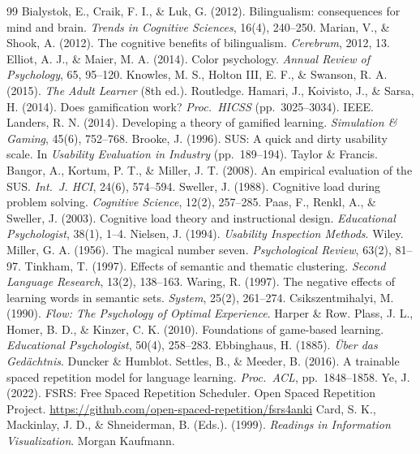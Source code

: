 \documentclass[10pt,a4paper]{article}
\begin{document}
\begin{thebibliography}{99}
\setlength\itemsep{2pt}
    Bialystok, E., Craik, F. I., \& Luk, G. (2012). Bilingualism: consequences for mind and brain. \emph{Trends in Cognitive Sciences}, 16(4), 240--250.
    Marian, V., \& Shook, A. (2012). The cognitive benefits of bilingualism. \emph{Cerebrum}, 2012, 13.
    Elliot, A. J., \& Maier, M. A. (2014). Color psychology. \emph{Annual Review of Psychology}, 65, 95--120.
    Knowles, M. S., Holton III, E. F., \& Swanson, R. A. (2015). \emph{The Adult Learner} (8th ed.). Routledge.
    Hamari, J., Koivisto, J., \& Sarsa, H. (2014). Does gamification work? \emph{Proc.\ HICSS} (pp.\ 3025--3034). IEEE.
    Landers, R. N. (2014). Developing a theory of gamified learning. \emph{Simulation \& Gaming}, 45(6), 752--768.
    Brooke, J. (1996). SUS: A quick and dirty usability scale. In \emph{Usability Evaluation in Industry} (pp.\ 189--194). Taylor \& Francis.
    Bangor, A., Kortum, P. T., \& Miller, J. T. (2008). An empirical evaluation of the SUS. \emph{Int.\ J. HCI}, 24(6), 574--594.
    Sweller, J. (1988). Cognitive load during problem solving. \emph{Cognitive Science}, 12(2), 257--285.
    Paas, F., Renkl, A., \& Sweller, J. (2003). Cognitive load theory and instructional design. \emph{Educational Psychologist}, 38(1), 1--4.
    Nielsen, J. (1994). \emph{Usability Inspection Methods}. Wiley.
    Miller, G. A. (1956). The magical number seven. \emph{Psychological Review}, 63(2), 81--97.
    Tinkham, T. (1997). Effects of semantic and thematic clustering. \emph{Second Language Research}, 13(2), 138--163.
    Waring, R. (1997). The negative effects of learning words in semantic sets. \emph{System}, 25(2), 261--274.
    Csikszentmihalyi, M. (1990). \emph{Flow: The Psychology of Optimal Experience}. Harper \& Row.
    Plass, J. L., Homer, B. D., \& Kinzer, C. K. (2010). Foundations of game-based learning. \emph{Educational Psychologist}, 50(4), 258--283.
    Ebbinghaus, H. (1885). \emph{\"Uber das Ged\"achtnis}. Duncker \& Humblot.
    Settles, B., \& Meeder, B. (2016). A trainable spaced repetition model for language learning. \emph{Proc.\ ACL}, pp.\ 1848--1858.
    Ye, J. (2022). FSRS: Free Spaced Repetition Scheduler. Open Spaced Repetition Project. \url{https://github.com/open-spaced-repetition/fsrs4anki}
    Card, S. K., Mackinlay, J. D., \& Shneiderman, B. (Eds.). (1999). \emph{Readings in Information Visualization}. Morgan Kaufmann.
\end{thebibliography}
\end{document}
